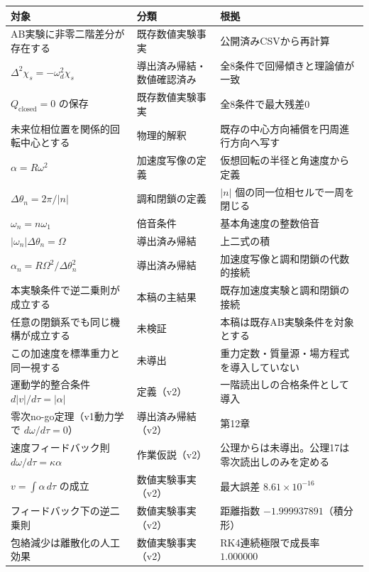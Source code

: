 \documentclass[
  a4paper,
]{ltjsarticle}
\newcounter{none} %
\begin{document}
{\def\LTcaptype{none} %
\begin{longtable}[]{@{}
  >{\raggedright\arraybackslash}p{}
  >{\raggedright\arraybackslash}p{}
  >{\raggedright\arraybackslash}p{}@{}}
\toprule\noalign{}
\begin{minipage}[b]{\linewidth}\raggedright
対象
\end{minipage} & \begin{minipage}[b]{\linewidth}\raggedright
分類
\end{minipage} & \begin{minipage}[b]{\linewidth}\raggedright
根拠
\end{minipage} \\
\midrule\noalign{}
\endhead
\bottomrule\noalign{}
\endlastfoot
AB実験に非零二階差分が存在する & 既存数値実験事実 &
公開済みCSVから再計算 \\
\(\Delta^2\chi_s=-\omega_d^2\chi_s\) & 導出済み帰結・数値確認済み &
全8条件で回帰傾きと理論値が一致 \\
\(Q_{\mathrm{closed}}=0\) の保存 & 既存数値実験事実 &
全8条件で最大残差0 \\
未来位相位置を関係的回転中心とする & 物理的解釈 &
既存の中心方向補償を円周進行方向へ写す \\
\(\alpha=R\omega^2\) & 加速度写像の定義 &
仮想回転の半径と角速度から定義 \\
\(\Delta\theta_n=2\pi/\lvert n\rvert\) & 調和閉鎖の定義 &
\(\lvert n\rvert\) 個の同一位相セルで一周を閉じる \\
\(\omega_n=n\omega_1\) & 倍音条件 & 基本角速度の整数倍音 \\
\(\lvert\omega_n\rvert\Delta\theta_n=\Omega\) & 導出済み帰結 &
上二式の積 \\
\(\alpha_n=R\Omega^2/\Delta\theta_n^2\) & 導出済み帰結 &
加速度写像と調和閉鎖の代数的接続 \\
本実験条件で逆二乗則が成立する & 本稿の主結果 &
既存加速度実験と調和閉鎖の接続 \\
任意の閉鎖系でも同じ機構が成立する & 未検証 &
本稿は既存AB実験条件を対象とする \\
この加速度を標準重力と同一視する & 未導出 &
重力定数・質量源・場方程式を導入していない \\
運動学的整合条件 \(d\lvert v\rvert/d\tau=\lvert\alpha\rvert\) &
定義（v2） & 一階読出しの合格条件として導入 \\
零次no-go定理（v1動力学で \(d\omega/d\tau=0\)） & 導出済み帰結（v2） &
第12章 \\
速度フィードバック則 \(d\omega/d\tau=\kappa\alpha\) & 作業仮説（v2） &
公理からは未導出。公理17は零次読出しのみを定める \\
\(v=\int\alpha\,d\tau\) の成立 & 数値実験事実（v2） & 最大誤差
\(8.61\times10^{-16}\) \\
フィードバック下の逆二乗則 & 数値実験事実（v2） & 距離指数
\(-1.999937891\)（積分形） \\
包絡減少は離散化の人工効果 & 数値実験事実（v2） & RK4連続極限で成長率
\(1.000000\) \\
\end{longtable}
}
\end{document}
